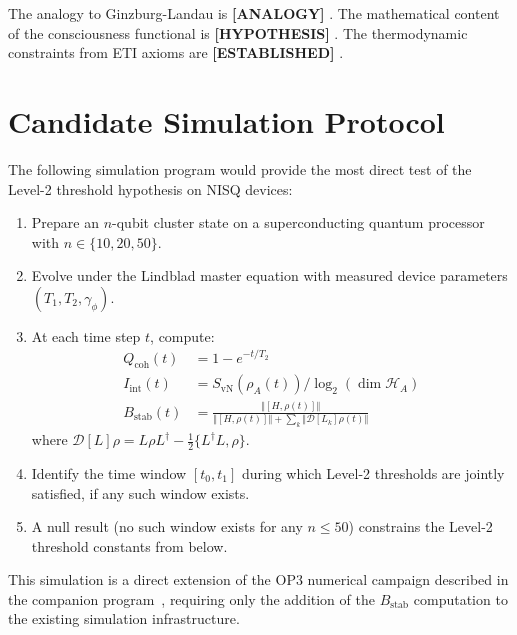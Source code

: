 \documentclass[12pt,letterpaper]{article}
\newcommand{\ESTABLISHED}[1]{\textcolor{green!50!black}{\textbf{[ESTABLISHED]}} #1}
\newcommand{\HYPOTHESIS}[1]{\textcolor{blue!70!black}{\textbf{[HYPOTHESIS]}} #1}
\newcommand{\ANALOGY}[1]{\textcolor{orange!70!black}{\textbf{[ANALOGY]}} #1}
\newcommand{\Qcoh}{Q_{\mathrm{coh}}}
\newcommand{\Iint}{I_{\mathrm{int}}}
\newcommand{\Bstab}{B_{\mathrm{stab}}}
\begin{document}
The analogy to Ginzburg-Landau is \ANALOGY{}. The mathematical content of
the consciousness functional is \HYPOTHESIS{}. The thermodynamic constraints
from ETI axioms are \ESTABLISHED{}.

\section{Candidate Simulation Protocol}
\label{app:simulation}

The following simulation program would provide the most direct test of the
Level-2 threshold hypothesis on NISQ devices:

\begin{enumerate}
  \item Prepare an $n$-qubit cluster state on a superconducting quantum processor
    with $n \in \{10, 20, 50\}$.
  \item Evolve under the Lindblad master equation with measured device parameters
    $(T_1, T_2, \gamma_\phi)$.
  \item At each time step $t$, compute:
    \begin{align}
      \Qcoh(t) &= 1 - e^{-t/T_2} \\
      \Iint(t) &= S_{\mathrm{vN}}(\rho_A(t)) / \log_2(\dim \mathcal{H}_A) \\
      \Bstab(t) &= \frac{\Vert [H, \rho(t)] \Vert}{\Vert [H, \rho(t)] \Vert + \sum_k \Vert \mathcal{D}[L_k]\rho(t) \Vert}
    \end{align}
    where $\mathcal{D}[L]\rho = L\rho L^\dagger - \tfrac{1}{2}\{L^\dagger L, \rho\}$.
  \item Identify the time window $[t_0, t_1]$ during which Level-2 thresholds
    are jointly satisfied, if any such window exists.
  \item A null result (no such window exists for any $n \leq 50$) constrains
    the Level-2 threshold constants from below.
\end{enumerate}

This simulation is a direct extension of the OP3 numerical campaign described
in the companion program~\cite{Monette2026a}, requiring only the addition of
the $\Bstab$ computation to the existing simulation infrastructure.
\end{document}
